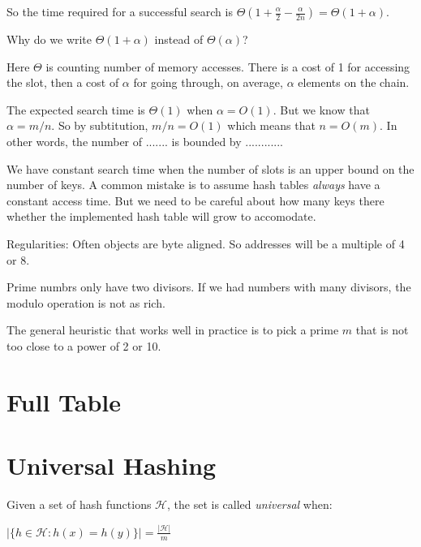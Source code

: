 So the time required for a successful search is $\Theta(1 + \frac{\alpha}{2} - \frac{\alpha}{2n}) = \Theta(1 + \alpha)$.

\frmrule 

\begin{example}
Why do we write $\Theta(1 + \alpha)$ instead of $\Theta(\alpha)$?
\end{example}

\frmrule 




\frmrule 



Here $\Theta$ is counting number of memory accesses. There is a cost of 1 for 
accessing the slot, then a cost of $\alpha$ for going through, on average, $\alpha$ elements 
on the chain. 

The expected search time is $\Theta(1)$ when $\alpha = O(1)$. 
But we know that $\alpha = m/n$. So by subtitution, $m/n = O(1)$ which means 
that $n = O(m)$. In other words, the number of ....... is bounded by ............


We have constant search time when the number of slots is an upper bound on the 
number of keys. A common mistake is to assume hash tables \textit{always} have a 
constant access time. But we need to be careful about how many keys there whether 
the implemented hash table will 
grow to accomodate. 


Regularities: Often objects are byte aligned. So addresses will be a multiple of 4 or 8. 

Prime numbrs only have two divisors. 
If we had numbers with many divisors, the modulo operation is not as rich. 

The general heuristic that works well in practice is to pick a prime $m$ 
that is not too close to a power of 2 or 10.  





\section{Full Table}





\section{Universal Hashing}


Given a set of hash functions $\mathcal{H}$, the set is called \textit{universal} when:

$|\{h \in \mathcal{H} : h(x) = h(y) \}| = \frac{|\mathcal{H}|}{m}$